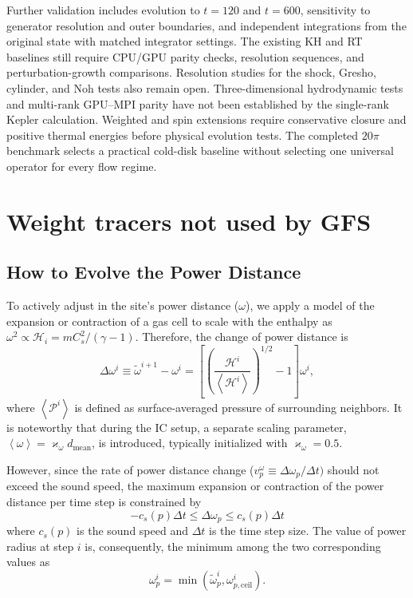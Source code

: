 \documentclass[twocolumn]{aastex63}
\newcommand{\pressure}[0]{\mathcal{P}}
\begin{document}
Further validation includes evolution to $t=120$ and $t=600$, sensitivity
to generator resolution and outer boundaries, and independent integrations
from the original state with matched integrator settings.
The existing KH and RT baselines still require CPU/GPU parity checks,
resolution sequences, and perturbation-growth comparisons.
Resolution studies for the shock, Gresho, cylinder, and Noh tests also
remain open. Three-dimensional hydrodynamic tests and multi-rank GPU--MPI
parity have not been established by the single-rank Kepler calculation.
Weighted and spin extensions require conservative closure and positive
thermal energies before physical evolution tests.
The completed $20\pi$ benchmark selects a practical cold-disk baseline
without selecting one universal operator for every flow regime.

\appendix
\section{Weight tracers not used by GFS}
\subsection{How to Evolve the Power Distance}
To actively adjust in the site's {power distance} ($\omega$), we apply a model of the expansion or contraction of a gas cell to scale with the enthalpy as $\omega^2 \propto \mathcal{H}_i =mC_s^2/(\gamma-1)$. Therefore, the change of power distance is
\begin{equation}
	\Delta\omega^{i} \equiv \tilde\omega^{i+1}-\omega^{i} = \left[ \left( \frac{\mathcal{H}^{i}}{\left<\mathcal{H}^i\right>}\right)^{1/2} -1\right] \omega^{i},
\end{equation}
where $\left<\pressure^i\right>$ is defined as surface-averaged pressure of surrounding neighbors. It is noteworthy that during the IC setup, a separate scaling parameter, $\left<\omega\right> = \varkappa_\omega d_\textrm{mean}$, is introduced, typically initialized with $\varkappa_\omega=0.5$.

However, since the rate of power distance change ($v_p^\omega \equiv\Delta\omega_p/\Delta t)$ should not exceed the sound speed, the maximum expansion or contraction of the power distance per time step is constrained by 
\begin{equation}
	-c_s(p) \Delta t \le \Delta \omega_p \leq c_s(p) \Delta t
\end{equation}
where $c_s(p)$ is the sound speed and $\Delta t$ is the time step size. The value of power radius at step $i$ is, consequently, the minimum among the two corresponding values as
\begin{equation}
	\omega^i_p = \min \left( \tilde\omega^i_p, \omega_{p,\textrm{ceil}}^i\right).
\end{equation}
\end{document}
